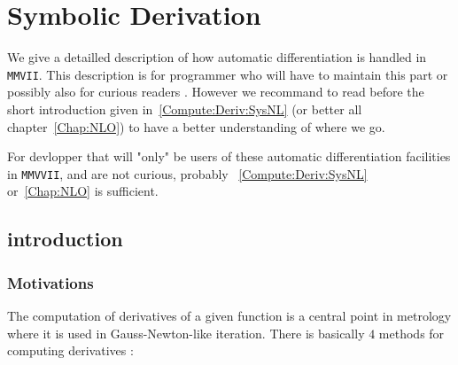 \chapter{Symbolic Derivation}

We give a detailled description of how automatic differentiation is handled in {\tt MMVII}.
This description is for programmer who will have to maintain this part or possibly also for curious readers .
However we recommand to read before the short introduction given in~\ref{Compute:Deriv:SysNL} (or better all chapter~\ref{Chap:NLO}) to
have a better understanding of where we go.

For devlopper that will "only" be users of these  automatic differentiation facilities in {\tt MMVVII}, 
and are not curious, probably ~\ref{Compute:Deriv:SysNL} or~\ref{Chap:NLO} is sufficient.



\section{introduction}


\subsection{Motivations}

The computation of derivatives of a given function is a central point in metrology
where it is used in Gauss-Newton-like iteration.  There is basically $4$ methods
for computing derivatives :

